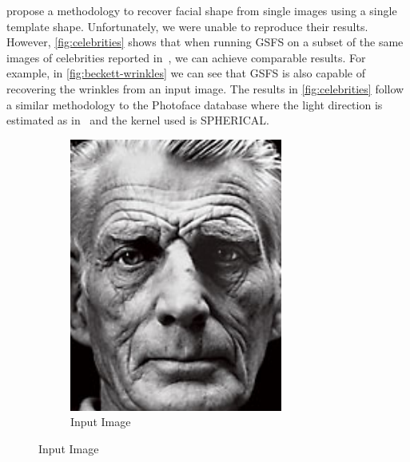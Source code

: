 \citet{kemelmacher2011facereconstruction} propose a methodology to recover
facial shape from single images using a single template shape. Unfortunately, we
were unable to reproduce their results. However, \cref{fig:celebrities} shows
that when running GSFS on a subset of the same images of celebrities reported
in~\citet{kemelmacher2011facereconstruction}, we can achieve comparable results.
For example, in \cref{fig:beckett-wrinkles} we can see that GSFS is also
capable of recovering the wrinkles from an input image. The results in
\cref{fig:celebrities} follow a similar methodology to the Photoface database
where the light direction is estimated as
in~\citet{kemelmacher2011facereconstruction} and the kernel used is SPHERICAL\@.
\begin{figure}
    \centering
    \begin{subfigure}{0.23\textwidth}
        \centering
        \caption*{Input Image}
        \includegraphics[width=\textwidth]{statistical_normals/images/gsfs_results/celebrities/samuel_beckett.png}

\end{subfigure}
\end{figure}
